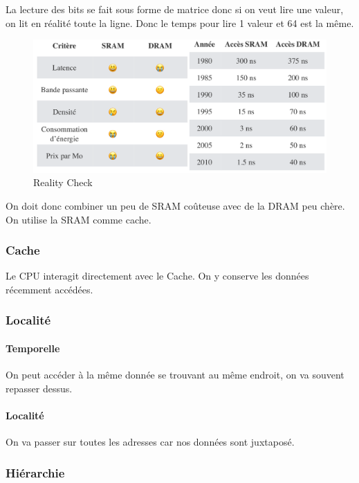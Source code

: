 La lecture des bits se fait sous forme de matrice donc si on veut lire
une valeur, on lit en réalité toute la ligne. Donc le temps pour lire 1
valeur et 64 est la même.

\begin{figure}
\centering
\includegraphics{image-10.png}
\caption{Reality Check}
\end{figure}

On doit donc combiner un peu de SRAM coûteuse avec de la DRAM peu chère.
On utilise la SRAM comme cache.

\subsubsection{Cache}\label{cache}

Le CPU interagit directement avec le Cache. On y conserve les données
récemment accédées.

\subsubsection{Localité}\label{localituxe9}

\paragraph{Temporelle}\label{temporelle}

On peut accéder à la même donnée se trouvant au même endroit, on va
souvent repasser dessus.

\paragraph{Localité}\label{localituxe9-1}

On va passer sur toutes les adresses car nos données sont juxtaposé.

\subsubsection{Hiérarchie}\label{hiuxe9rarchie}

